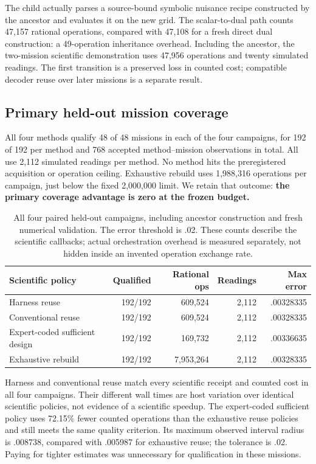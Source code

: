 \documentclass[11pt]{article}
\begin{document}
The child actually parses a source-bound symbolic nuisance recipe constructed by the ancestor and evaluates it on the new grid. The scalar-to-dual path counts 47,157 rational operations, compared with 47,108 for a fresh direct dual construction: a 49-operation inheritance overhead. Including the ancestor, the two-mission scientific demonstration uses 47,956 operations and twenty simulated readings. The first transition is a preserved loss in counted cost; compatible decoder reuse over later missions is a separate result.

\subsection{Primary held-out mission coverage}

All four methods qualify 48 of 48 missions in each of the four campaigns, for 192 of 192 per method and 768 accepted method--mission observations in total. All use 2,112 simulated readings per method. No method hits the preregistered acquisition or operation ceiling. Exhaustive rebuild uses 1,988,316 operations per campaign, just below the fixed 2,000,000 limit. We retain that outcome: \textbf{the primary coverage advantage is zero at the frozen budget.}

\begin{table}[htbp]
\centering\small
\begin{tabularx}{\linewidth}{Y r r r r}
\toprule
\textbf{Scientific policy} & \textbf{Qualified} & \textbf{Rational ops} & \textbf{Readings} & \textbf{Max error}\\
\midrule
Harness reuse & 192/192 & 609,524 & 2,112 & .00328335\\
Conventional reuse & 192/192 & 609,524 & 2,112 & .00328335\\
Expert-coded sufficient design & 192/192 & 169,732 & 2,112 & .00336635\\
Exhaustive rebuild & 192/192 & 7,953,264 & 2,112 & .00328335\\
\bottomrule
\end{tabularx}
\caption{All four paired held-out campaigns, including ancestor construction and fresh numerical validation. The error threshold is .02. These counts describe the scientific callbacks; actual orchestration overhead is measured separately, not hidden inside an invented operation exchange rate.}
\label{tab:primary}
\end{table}

Harness and conventional reuse match every scientific receipt and counted cost in all four campaigns. Their different wall times are host variation over identical scientific policies, not evidence of a scientific speedup. The expert-coded sufficient policy uses 72.15\% fewer counted operations than the exhaustive reuse policies and still meets the same quality criterion. Its maximum observed interval radius is .008738, compared with .005987 for exhaustive reuse; the tolerance is .02. Paying for tighter estimates was unnecessary for qualification in these missions.
\end{document}
